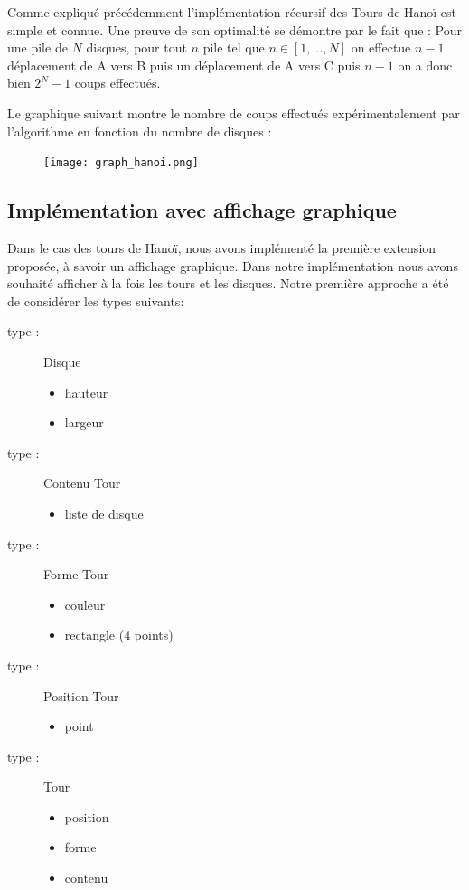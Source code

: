 \documentclass[a4paper,11pt]{article}
\begin{document}
Comme expliqué précédemment l'implémentation récursif des Tours de Hanoï est simple et connue.
Une preuve de son optimalité se démontre par le fait que :
Pour une pile de $N$ disques, pour tout $n$ pile tel que $n \in [1,...,N]$ on effectue $n-1$ déplacement de A vers B puis un déplacement de A vers C puis $n-1$ on a donc bien $2^{N} - 1$ coups effectués.

Le graphique suivant montre le nombre de coups effectués expérimentalement par l'algorithme en fonction du nombre de disques :
\begin{figure}[h]
  \texttt{[image: graph\_hanoi.png]}
  \label{fig:graph_hanoi}
\end{figure}


\subsection{Implémentation avec affichage graphique}
Dans le cas des tours de Hanoï, nous avons implémenté la première extension proposée, à savoir un affichage graphique.
Dans notre implémentation nous avons souhaité afficher à la fois les tours et les disques.
Notre première approche a été de considérer les types suivants:

\begin{multicols}{3}
\begin{description}
\item[type :] Disque 
	\begin{itemize}
	\item hauteur
	\item largeur 
	\end{itemize}
\item[type :] Contenu Tour
	\begin{itemize}
	\item liste de disque
	\end{itemize}
\item[type :] Forme Tour
	\begin{itemize}
	\item couleur
	\item rectangle (4 points) 
	\end{itemize}
\item[type :]Position Tour
	\begin{itemize}
	\item point 
	\end{itemize}
\item [type :] Tour 
	\begin{itemize}
	\item position
	\item forme
	\item contenu 
	\end{itemize}
\end{description}
\end{multicols}
\end{document}
